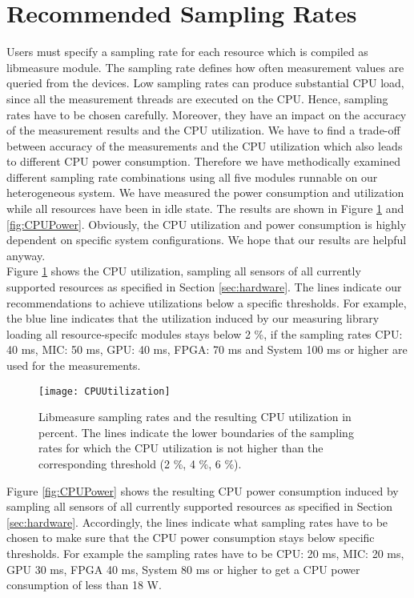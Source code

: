 \section{Recommended Sampling Rates} \label{app:A}
Users must specify a sampling rate for each resource which is compiled as libmeasure module. The sampling rate defines how often measurement values are queried from the devices. Low sampling rates can produce substantial CPU load, since all the measurement threads are executed on the CPU. Hence, sampling rates have to be chosen carefully. Moreover, they have an impact on the accuracy of the measurement results and the CPU utilization. We have to find a trade-off between accuracy of the measurements and the CPU utilization which also leads to different CPU power consumption. Therefore we have methodically examined different sampling rate combinations using all five modules runnable on our heterogeneous system. We have measured the power consumption and utilization while all resources have been in idle state. The results are shown in Figure \ref{fig:CPUUtilization} and \ref{fig:CPUPower}. Obviously, the CPU utilization and power consumption is highly dependent on specific system configurations. We hope that our results are helpful anyway.\\

Figure \ref{fig:CPUUtilization} shows the CPU utilization, sampling all sensors of all currently supported resources as specified in Section \ref{sec:hardware}. The lines indicate our recommendations to achieve utilizations below a specific thresholds. For example, the blue line indicates that the utilization induced by our measuring library loading all resource-specifc modules stays below 2 \%, if the sampling rates CPU: 40 ms, MIC: 50 ms, GPU: 40 ms, FPGA: 70 ms and System 100 ms or higher are used for the measurements.

\begin{figure}[!h]
\begin{center}
\texttt{[image: CPUUtilization]} 
\caption{Libmeasure sampling rates and the resulting CPU utilization in percent. The lines indicate the lower boundaries of the sampling rates for which the CPU utilization is not higher than the corresponding threshold (2 \%, 4 \%, 6 \%).}
\label{fig:CPUUtilization}
\end{center}
\end{figure}

Figure \ref{fig:CPUPower} shows the resulting CPU power consumption induced by sampling all sensors of all currently supported resources as specified in Section \ref{sec:hardware}. Accordingly, the lines indicate what sampling rates have to be chosen to make sure that the CPU power consumption stays below specific thresholds. For example the sampling rates have to be CPU: 20 ms, MIC: 20 ms, GPU 30 ms, FPGA 40 ms, System 80 ms or higher to get a CPU power consumption of less than 18 W.\\

